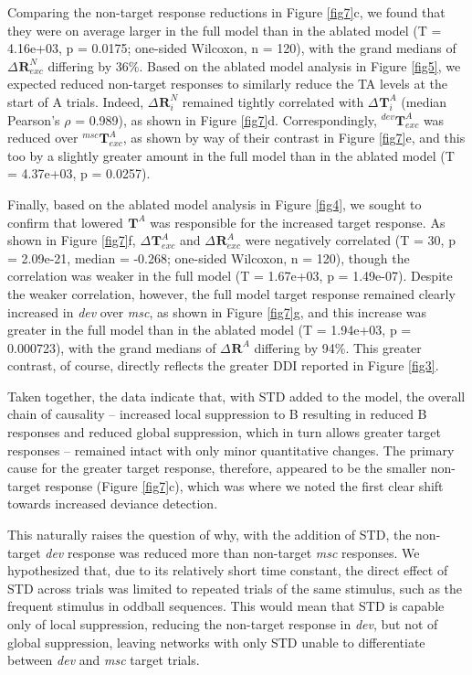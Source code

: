 \documentclass[pdflatex,referee,iicol,sn-basic]{sn-jnl}
\newcommand{\dev}{\textit{dev}}
\newcommand{\msc}{\textit{msc}}
\renewcommand{\R}[3][]{{}^{#1}_{}\!\mathbf{R}^{#2}_{#3}}
\renewcommand{\T}[3][]{{}^{#1}_{}\mathbf{T}^{#2}_{#3}}
\theoremstyle{thmstyleone}%
\theoremstyle{thmstyletwo}%
\theoremstyle{thmstylethree}%
\begin{document}
Comparing the non-target response reductions in Figure \ref{fig7}c, we found that they were on average larger in the full model than in the ablated model (T = 4.16e+03, p = 0.0175; one-sided Wilcoxon, n = 120), with the grand medians of $\Delta \R{N}{exc}$ differing by 36\%. Based on the ablated model analysis in Figure \ref{fig5}, we expected reduced non-target responses to similarly reduce the TA levels at the start of A trials. Indeed, $\Delta \R{N}{i}$ remained tightly correlated with $\Delta \T{A}{i}$ (median Pearson's $\rho$ = 0.989), as shown in Figure \ref{fig7}d. Correspondingly, $\T[dev]{A}{exc}$ was reduced over $\T[msc]{A}{exc}$, as shown by way of their contrast in Figure \ref{fig7}e, and this too by a slightly greater amount in the full model than in the ablated model (T = 4.37e+03, p = 0.0257).

Finally, based on the ablated model analysis in Figure \ref{fig4}, we sought to confirm that lowered $\T{A}{}$ was responsible for the increased target response. As shown in Figure \ref{fig7}f, $\Delta \T{A}{exc}$ and $\Delta \R{A}{exc}$ were negatively correlated (T = 30, p = 2.09e-21, median = -0.268; one-sided Wilcoxon, n = 120), though the correlation was weaker in the full model (T = 1.67e+03, p = 1.49e-07). Despite the weaker correlation, however, the full model target response remained clearly increased in \dev{} over \msc{}, as shown in Figure \ref{fig7}g, and this increase was greater in the full model than in the ablated model (T = 1.94e+03, p = 0.000723), with the grand medians of $\Delta \R{A}{}$ differing by 94\%. This greater contrast, of course, directly reflects the greater DDI reported in Figure \ref{fig3}.

Taken together, the data indicate that, with STD added to the model, the overall chain of causality -- increased local suppression to B resulting in reduced B responses and reduced global suppression, which in turn allows greater target responses -- remained intact with only minor quantitative changes. The primary cause for the greater target response, therefore, appeared to be the smaller non-target response (Figure \ref{fig7}c), which was where we noted the first clear shift towards increased deviance detection.

This naturally raises the question of why, with the addition of STD, the non-target \dev{} response was reduced more than non-target \msc{} responses. We hypothesized that, due to its relatively short time constant, the direct effect of STD across trials was limited to repeated trials of the same stimulus, such as the frequent stimulus in oddball sequences. This would mean that STD is capable only of local suppression, reducing the non-target response in \dev{}, but not of global suppression, leaving networks with only STD unable to differentiate between \dev{} and \msc{} target trials.
\end{document}
